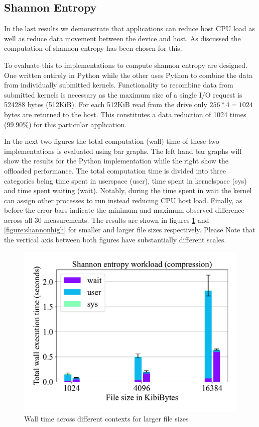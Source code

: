 \subsection{Shannon Entropy}

In the last results we demonstrate that applications can reduce host CPU load
as well as reduce data movement between the device and host. As discussed the
computation of shannon entropy has been chosen for this.

\label{re2}

To evaluate this to implementations to compute shannon entropy are designed.
One written entirely in Python while the other uses Python to combine the
data from individually submitted kernels. Functionality to recombine data from
submitted kernels is necessary as the maximum size of a single I/O request is
524288 bytes (512KiB). For each 512KiB read from the drive only
$256 * 4=1024$ bytes are returned to the host. This constitutes a data reduction
of 1024 times (99.90\%) for this particular application.

In the next two figures the total computation (wall) time of these two
implementations is evaluated using bar graphs. The left hand bar graphs will show
the results for the Python implementation while the right show the offloaded
performance. The total computation time is divided into three categories being
time spent in userspace (user), time spent in kernelspace (sys) and time spent
waiting (wait). Notably, during the time spent in wait the kernel can assign
other processes to run instead reducing CPU host load. Finally, as before the
error bars indicate the minimum and maximum observed difference across all 30
measurements. The results are shown in figures \ref{figure:shannonlow} and
\ref{figure:shannonhigh} for smaller and larger file sizes respectively. Please
Note that the vertical axis between both figures have substantially different
scales.

\begin{figure}[h]
    \centering
	\includegraphics[width=1\textwidth]{resources/images/results-shannon-lower.pdf}
	\caption{Wall time across different contexts for larger file sizes}
    \label{figure:shannonlow}
\end{figure}


